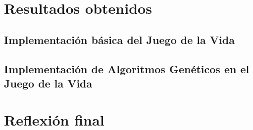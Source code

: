 \section{Resultados obtenidos}

\subsection{Implementación básica del Juego de la Vida}




\subsection{Implementación de Algoritmos Genéticos en el Juego de la Vida}




\section{Reflexión final}

